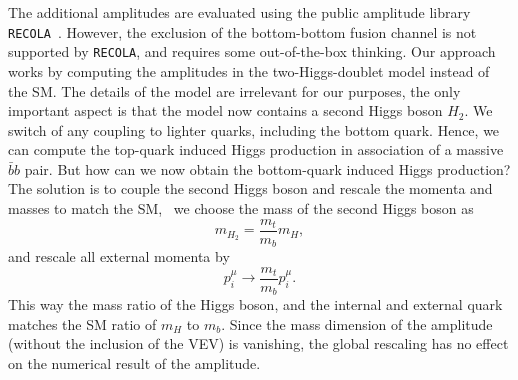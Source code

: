 The additional amplitudes are evaluated using the public amplitude library \texttt{RECOLA}~\cite{Actis:2016mpe}. However, the exclusion of the bottom-bottom fusion channel is not supported by \texttt{RECOLA}, and requires some out-of-the-box thinking. Our approach works by computing the amplitudes in the two-Higgs-doublet model instead of the \acs{SM}. The details of the model are irrelevant for our purposes, the only important aspect is that the model now contains a second Higgs boson $H_2$. We switch of any coupling to lighter quarks, including the bottom quark. Hence, we can compute the top-quark induced Higgs production in association of a massive $\bar{b} b$ pair. But how can we now obtain the bottom-quark induced Higgs production? The solution is to couple the second Higgs boson and rescale the momenta and masses to match the \acs{SM}, \ie\ we choose the mass of the second Higgs boson as
\begin{equation}
m_{H_2} = \frac{m_t}{m_b} m_H,
\end{equation}
and rescale all external momenta by
\begin{equation}
p_i^\mu \rightarrow \frac{m_t}{m_b} p_i^\mu.
\end{equation}
This way the mass ratio of the Higgs boson, and the internal and external quark matches the \acs{SM} ratio of $m_H$ to $m_b$. Since the mass dimension of the amplitude (without the inclusion of the \acs{VEV}) is vanishing, the global rescaling has no effect on the numerical result of the amplitude.

